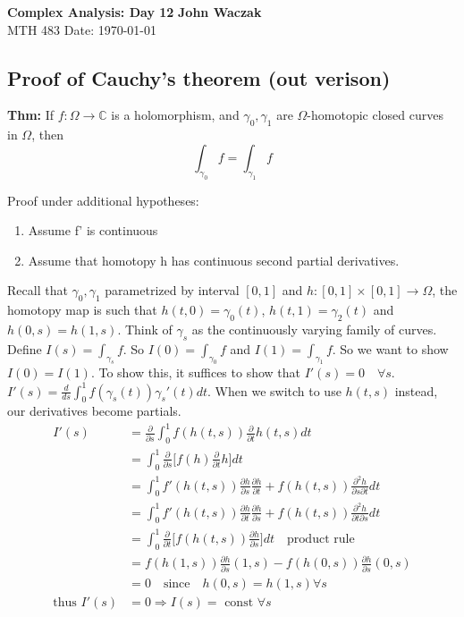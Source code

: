 \documentclass[a4paper, 11pt]{article}
\begin{document}
\noindent
\large\textbf{Complex Analysis: Day 12} \hfill \textbf{John Waczak} \\
\normalsize MTH 483 \hfill  Date: \today \\

\subsection*{Proof of Cauchy's theorem (out verison)} 
	\textbf{Thm:} If $f:\Omega\rightarrow\mathbb{C}$ is a holomorphism, and $\gamma_0, \gamma_1$ are $\Omega$-homotopic closed curves in $\Omega$, then 
		\begin{equation*}
			\int_{\gamma_0} f = \int_{\gamma_1} f
		\end{equation*}

	\noindent Proof under additional hypotheses: 
		\begin{enumerate}
			\item Assume f' is continuous 
			\item Assume that homotopy h has continuous second partial derivatives. 
		\end{enumerate}

	\noindent Recall that $\gamma_0, \gamma_1$ parametrized by interval $[0,1]$ and $h:[0,1]\times[0,1]\rightarrow\Omega$, the homotopy map is such that $h(t,0) = \gamma_0(t)$, $h(t,1) = \gamma_2(t)$ and $h(0,s)=h(1,s)$. Think of $\gamma_s$ as the continuously varying family of curves. \\ 
	
	\noindent Define $I(s) = \int_{\gamma_s} f$. So $I(0)=\int_{\gamma_0} f$ and $I(1)=\int_{\gamma_1} f$. So we want to show $I(0)=I(1)$. To show this, it suffices to show that $I'(s)=0 \quad \forall s$. \\ 
	
	\noindent $I'(s) = \frac{d}{ds}\int_0^1 f(\gamma_s(t))\gamma_s'(t)dt$. When we switch to use $h(t,s)$ instead, our derivatives become partials. 
		\begin{align*}
		I'(s)	&= \frac{\partial}{\partial s}\int_0^1 f(h(t,s))\frac{\partial}{\partial t}h(t,s)dt \\ 
			&= \int_0^1 \frac{\partial}{\partial s}\Big[f(h)\frac{\partial}{\partial t} h\Big]dt \\ 
			&= \int_0^1 f'(h(t,s))\frac{\partial h}{\partial s}\frac{\partial h}{\partial t} + f(h(t,s))\frac{\partial^2 h}{\partial s \partial t} dt \\
			&= \int_0^1 f'(h(t,s))\frac{\partial h}{\partial t}\frac{\partial h}{\partial s} + f(h(t,s))\frac{\partial^2 h}{\partial t \partial s}dt \\
			&= \int_0^1 \frac{\partial }{\partial t} \Big[f(h(t,s))\frac{\partial h}{\partial s}\Big]dt \quad \text{product rule} \\ 
			&= f(h(1,s))\frac{\partial h}{\partial s}(1,s) -f(h(0,s))\frac{\partial h}{\partial s}(0,s) \\ 
			&= 0 \quad \text{since} \quad h(0,s)=h(1,s) \forall s \\ 
		\text{thus } I'(s) &= 0 \Rightarrow I(s) = \text{ const } \forall s
		\end{align*}
\end{document}
